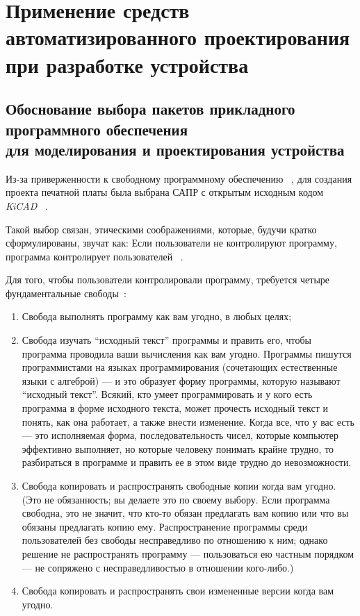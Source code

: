 \section{Применение средств автоматизированного проектирования \\
  при разработке устройства}

\subsection{Обоснование выбора пакетов прикладного программного обеспечения \\
  для моделирования и проектирования устройства}

Из-за приверженности к свободному программному обеспечению
~\cite{GNU-philosophy}, для создания проекта печатной платы была
выбрана САПР с открытым исходным кодом \textit{KiCAD}
~\cite{kicad-license}.

Такой выбор связан, этическими соображениями, которые, будучи
кратко сформулированы, звучат как:
Если пользователи не контролируют программу,
программа контролирует пользователей ~\cite{unfair-nonfree-programms}.

Для того, чтобы пользователи контролировали программу, требуется
четыре фундаментальные свободы~\cite{unfair-nonfree-programms}:

\begin{enumerate}
\item Свобода выполнять программу как вам угодно, в любых целях;
  
\item Свобода изучать “исходный текст” программы и править его, чтобы
программа проводила ваши вычисления как вам угодно. Программы пишутся
программистами на языках программирования (сочетающих естественные
языки с алгеброй) — и это образует форму программы, которую называют
“исходный текст”. Всякий, кто умеет программировать и у кого есть
программа в форме исходного текста, может прочесть исходный текст и
понять, как она работает, а также внести изменение. Когда все, что у
вас есть — это исполняемая форма, последовательность чисел, которые
компьютер эффективно выполняет, но которые человеку понимать крайне
трудно, то разбираться в программе и править ее в этом виде трудно до
невозможности.

\item  Свобода копировать и распространять свободные копии когда вам
угодно. (Это не обязанность; вы делаете это по своему выбору. Если
программа свободна, это не значит, что кто-то обязан предлагать вам
копию или что вы обязаны предлагать копию ему. Распространение
программы среди пользователей без свободы несправедливо по отношению к
ним; однако решение не распространять программу — пользоваться ею
частным порядком — не сопряжено с несправедливостью в отношении
кого-либо.)

\item Свобода копировать и распространять свои измененные версии когда
вам угодно.
\end{enumerate}

